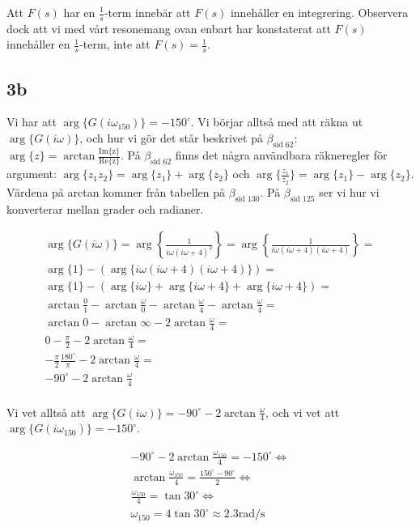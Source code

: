 \documentclass[a4paper]{article}
\newcommand{\mhb}[1]{$\beta_{\text{#1}}$}     %
\begin{document}
Att $F(s)$ har en $\frac{1}{s}$-term innebär att $F(s)$ innehåller en integrering. Observera dock att vi med vårt resonemang ovan enbart har konstaterat att $F(s)$ innehåller en $\frac{1}{s}$-term, inte att $F(s) = \frac{1}{s}$.


\subsection{3b}
Vi har att $\arg\{ G(i\omega_{150}) \} = -150^\circ$. Vi börjar alltså med att räkna ut $\arg \{ G(i\omega) \}$, och hur vi gör det står beskrivet på \mhb{sid 62}: $\arg\{z\} = \arctan{\frac{\text{Im\{z\}}}{\text{Re\{z\}}}}$. På \mhb{sid 62} finns det några användbara räkneregler för argument: $\arg\{ z_1 z_2 \} = \arg \{z_1\} + \arg \{z_2\}$ och $\arg\{ \frac{z_1}{z_2} \} = \arg\{ z_1 \} - \arg\{ z_2 \}$. Värdena på arctan kommer från tabellen på \mhb{sid 130}. På \mhb{sid 125} ser vi hur vi konverterar mellan grader och radianer.

\begin{align*}
  \arg\{ G(i\omega) \} = \arg \left \{ \frac{1}{i\omega(i\omega + 4)^2} \right \} =
  \arg \left \{ \frac{1}{i\omega(i\omega + 4)(i\omega + 4)} \right \} =\\
  \arg \{ 1 \} -(\arg\{ i\omega(i\omega + 4)(i\omega + 4) \}) =\\
  \arg \{ 1 \} -(\arg\{ i\omega\} + \arg\{ i\omega + 4 \} + \arg\{ i\omega + 4\}) =\\
  \arctan\frac{0}{1} - \arctan \frac{\omega}{0} -\arctan\frac{\omega}{4} -\arctan\frac{\omega}{4} =\\
  \arctan 0 - \arctan \infty -2\arctan\frac{\omega}{4} =\\
  0 -\frac{\pi}{2} -2\arctan\frac{\omega}{4} =\\
  -\frac{\pi}{2}\frac{180^\circ}{\pi} -2\arctan\frac{\omega}{4} =\\
  -90^\circ -2\arctan\frac{\omega}{4}\\
\end{align*}

Vi vet alltså att $\arg \{ G(i\omega) \} = -90^\circ -2\arctan\frac{\omega}{4}$, och vi vet att $\arg\{ G(i\omega_{150}) \} = -150^\circ$.

\begin{align*}
  -90^\circ -2\arctan\frac{\omega_{150}}{4} = -150^\circ \Longleftrightarrow\\
  \arctan\frac{\omega_{150}}{4} = \frac{150^\circ - 90^\circ}{2} \Longleftrightarrow\\
  \frac{\omega_{150}}{4} = \tan 30^\circ \Longleftrightarrow\\
  \omega_{150} = 4\tan 30^\circ \approx 2.3 \text{rad/s}\\
\end{align*}
\end{document}
